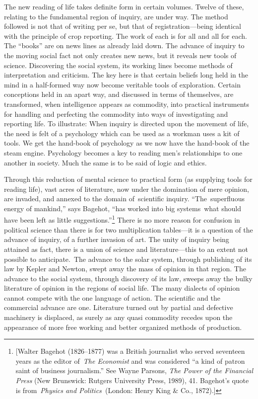 \documentclass[twoside,symmetric,nobib,justified]{tufte-book}
\begin{document}
The new reading of life takes definite form in certain volumes. Twelve
of these, relating to the fundamental region of inquiry, are under way.
The method followed is not that of writing per se, but that of
registration---being identical with the principle of crop reporting. The
work of each is for all and all for each. The ``books'' are on news
lines as already laid down. The advance of inquiry to the moving social
fact not only creates new news, but it reveals new tools of science.
Discovering the social system, its working lines become methods of
interpretation and criticism. The key here is that certain beliefs long
held in the mind in a half-formed way now become veritable tools of
exploration. Certain conceptions held in an apart way, and discussed in
terms of themselves, are transformed, when intelligence appears as
commodity, into practical instruments for handling and perfecting the
commodity into ways of investigating and reporting life. To illustrate:
When inquiry is directed upon the movement of life, the need is felt of
a psychology which can be used as a workman uses a kit of tools. We get
the hand-book of psychology as we now have the hand-book of the steam
engine. Psychology becomes a key to reading men's relationships to one
another in society. Much the same is to be said of logic and ethics.~

Through this reduction of mental science to practical form (as supplying
tools for reading life), vast acres of literature, now under the
domination of mere opinion, are invaded, and annexed to the domain
of~scientific inquiry. ``The~superfluous energy of mankind,'' says
Bagehot, ``has worked into big systems~what should have been left as
little suggestions.''\footnote{{[}Walter Bagehot (1826--1877) was a
  British journalist who served seventeen years as the editor
  of~\emph{The Economist} and was considered ``a kind of patron saint of
  business journalism.'' See Wayne Parsons, \emph{The Power of the
  Financial Press} (New Brunswick: Rutgers University Press, 1989), 41.
  Bagehot's quote is from~\emph{Physics and Politics~}(London: Henry
  King \& Co., 1872).{]}} There is no more reason for confusion in
political science than there is for two multiplication tables---it is a
question of the advance of inquiry, of a further invasion of art. The
unity of inquiry being attained as fact, there is a union of science and
literature---this to an extent not possible to anticipate.~The advance
to the solar system, through publishing of its law by Kepler and Newton,
swept away the mass of opinion in that region. The advance to the social
system, through discovery of its law, sweeps away the bulky literature
of opinion in the regions of social life. The many dialects of opinion
cannot compete with the one language of action. The scientific and the
commercial advance are one. Literature turned out by partial and
defective machinery is displaced, as surely as any quasi commodity
recedes upon the appearance of more free working and better organized
methods of production.~
\end{document}

